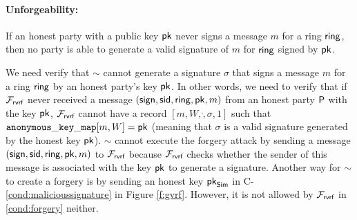 \paragraph{Unforgeability:}  If an honest party with a public key $ \mathsf{pk} $ never signs a message $ m $ for a ring $ \mathsf{ring} $, then no party is able to generate a valid signature of $ m $ for $ \mathsf{ring} $ signed by $ \mathsf{pk} $. 

We need verify that $ \sim $ cannot generate a signature $ \sigma $ that signs a message $ m $ for a ring $ \mathsf{ring} $ by an honest party's key $ \mathsf{pk} $. In other words, we need to verify that if $ \mathcal{F}_{\textsf{rvrf}} $ never received a message $ (\mathsf{sign}, \textsf{sid},\mathsf{ring},\mathsf{pk},m) $ from an honest party $ \mathsf{P} $ with the key $ \mathsf{pk} $, $ \mathcal{F}_{\textsf{rvrf}} $ cannot have a record $ [m, W, \ring, \sigma, 1] $ such that $ \mathtt{anonymous\_key\_map}[m,W]  = \mathsf{pk}$ (meaning that $ \sigma $ is a valid signature generated by the honest key $ \mathsf{pk} $). 
$ \sim $ cannot execute the forgery attack by sending a message $ (\mathsf{sign}, \textsf{sid},\mathsf{ring},\mathsf{pk},m) $ to $ \mathcal{F}_{\textsf{rvrf}} $ because $ \mathcal{F}_{\textsf{rvrf}} $ checks whether the sender of this message is associated with the key $ \mathsf{pk} $ to generate a signature. Another way for $ \sim $ to create a forgery is by sending an honest key $ \mathsf{pk}_{\mathsf{Sim}} $  in C-\ref{cond:malicioussignature} in Figure \ref{f:gvrf}. However, it is not allowed by $ \mathcal{F}_{\textsf{rvrf}} $ in \ref{cond:forgery} neither.


%

